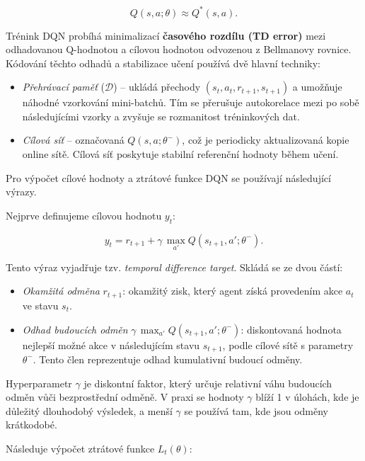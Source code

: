 \begin{equation}
Q(s,a;\theta)\approx Q^*(s,a).
\end{equation}

Trénink DQN probíhá minimalizací \textbf{časového rozdílu (TD error)} mezi odhadovanou Q-hodnotou a cílovou hodnotou odvozenou z Bellmanovy rovnice. Kódování těchto odhadů a stabilizace učení používá dvě hlavní techniky:

\begin{itemize}
    \item \textit{Přehrávací paměť} (\(\mathcal{D}\)) – ukládá přechody \((s_t,a_t,r_{t+1},s_{t+1})\) a umožňuje náhodné vzorkování mini-batchů. Tím se přerušuje autokorelace mezi po sobě následujícími vzorky a zvyšuje se rozmanitost tréninkových dat.
    \item \textit{Cílová síť} – označovaná \(Q(s,a;\theta^-)\), což je periodicky aktualizovaná kopie online sítě. Cílová síť poskytuje stabilní referenční hodnoty během učení.
\end{itemize}

\newpage

Pro výpočet cílové hodnoty a ztrátové funkce DQN se používají následující výrazy.

Nejprve definujeme cílovou hodnotu \(y_t\):

\begin{equation}
y_t = r_{t+1} + \gamma\,\max_{a'}Q(s_{t+1},a';\theta^-).
\end{equation}

Tento výraz vyjadřuje tzv. \textit{temporal difference target}. Skládá se ze dvou částí:
\begin{itemize}
    \item \textit{Okamžitá odměna} \(r_{t+1}\): okamžitý zisk, který agent získá provedením akce \(a_t\) ve stavu \(s_t\).
    \item \textit{Odhad budoucích odměn} \(\gamma\,\max_{a'}Q(s_{t+1},a';\theta^-)\): diskontovaná hodnota nejlepší možné akce v následujícím stavu \(s_{t+1}\), podle cílové sítě s parametry \(\theta^-\). Tento člen reprezentuje odhad kumulativní budoucí odměny.
\end{itemize}

Hyperparametr \(\gamma\) je diskontní faktor, který určuje relativní váhu budoucích odměn vůči bezprostřední odměně. V praxi se hodnoty \(\gamma\) blíží 1 v úlohách, kde je důležitý dlouhodobý výsledek, a menší \(\gamma\) se používá tam, kde jsou odměny krátkodobé.

Následuje výpočet ztrátové funkce \(L_t(\theta)\):

